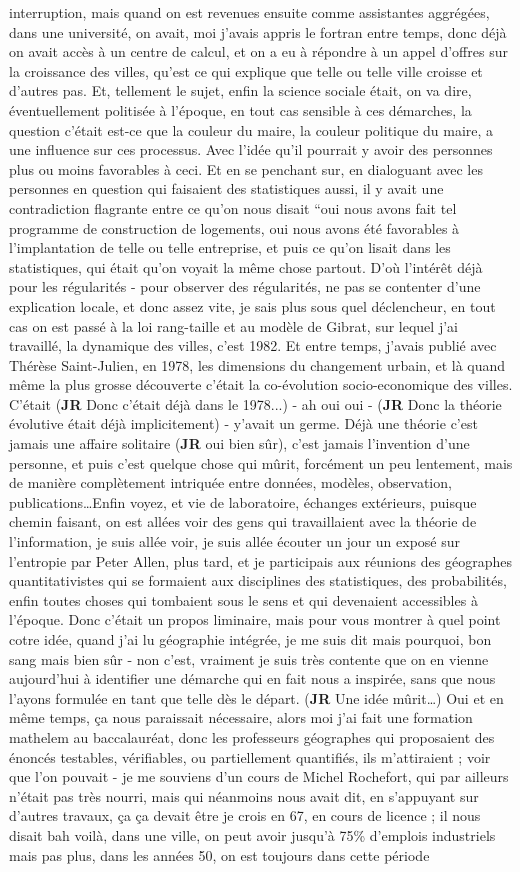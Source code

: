 \documentclass[12pt]{article}
\begin{document}
interruption, mais quand on est revenues ensuite comme assistantes aggrégées, dans une université, on avait, moi j'avais appris le fortran entre temps, donc déjà on avait accès à un centre de calcul, et on a eu à répondre à un appel d'offres sur la croissance des villes, qu'est ce qui explique que telle ou telle ville croisse et d'autres pas. Et, tellement le sujet, enfin la science sociale était, on va dire, éventuellement politisée à l'époque, en tout cas sensible à ces démarches, la question c'était est-ce que la couleur du maire, la couleur politique du maire, a une influence sur ces processus. Avec l'idée qu'il pourrait y avoir des personnes plus ou moins favorables à ceci. Et en se penchant sur, en dialoguant avec les personnes en question qui faisaient des statistiques aussi, il y avait une contradiction flagrante entre ce qu'on nous disait ``oui nous avons fait tel programme de construction de logements, oui nous avons été favorables à l'implantation de telle ou telle entreprise, et puis ce qu'on lisait dans les statistiques, qui était qu'on voyait la même chose partout. D'où l'intérêt déjà pour les régularités - pour observer des régularités, ne pas se contenter d'une explication locale, et donc assez vite, je sais plus sous quel déclencheur, en tout cas on est passé à la loi rang-taille et au modèle de Gibrat, sur lequel j'ai travaillé, la dynamique des villes, c'est 1982. Et entre temps, j'avais publié avec Thérèse Saint-Julien, en 1978, les dimensions du changement urbain, et là quand même la plus grosse découverte c'était la co-évolution socio-economique des villes. C'était (\textbf{JR} Donc c'était déjà dans le 1978...) - ah oui oui - (\textbf{JR} Donc la théorie évolutive était déjà implicitement) - y'avait un germe. Déjà une théorie c'est jamais une affaire solitaire (\textbf{JR} oui bien sûr), c'est jamais l'invention d'une personne, et puis c'est quelque chose qui mûrit, forcément un peu lentement, mais de manière complètement intriquée entre données, modèles, observation, publications\ldots Enfin voyez, et vie de laboratoire, échanges extérieurs, puisque chemin faisant, on est allées voir des gens qui travaillaient avec la théorie de l'information, je suis allée voir, je suis allée écouter un jour un exposé sur l'entropie par Peter Allen, plus tard, et je participais aux réunions des géographes quantitativistes qui se formaient aux disciplines des statistiques, des probabilités, enfin toutes choses qui tombaient sous le sens et qui devenaient accessibles à l'époque. Donc c'était un propos liminaire, mais pour vous montrer à quel point cotre idée, quand j'ai lu géographie intégrée, je me suis dit mais pourquoi, bon sang mais bien sûr - non c'est, vraiment je suis très contente que on en vienne aujourd'hui à identifier une démarche qui en fait nous a inspirée, sans que nous l'ayons formulée en tant que telle dès le départ. (\textbf{JR} Une idée mûrit\ldots ) Oui et en même temps, ça nous paraissait nécessaire, alors moi j'ai fait une formation mathelem au baccalauréat, donc les professeurs géographes qui proposaient des énoncés testables, vérifiables, ou partiellement quantifiés, ils m'attiraient ; voir que l'on pouvait - je me souviens d'un cours de Michel Rochefort, qui par ailleurs n'était pas très nourri, mais qui néanmoins nous avait dit, en s'appuyant sur d'autres travaux, ça ça devait être je crois en 67, en cours de licence ; il nous disait bah voilà, dans une ville, on peut avoir jusqu'à 75\% d'emplois industriels mais pas plus, dans les années 50, on est toujours dans cette période 

\end{document}
